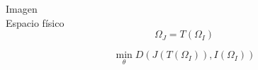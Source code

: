 \documentclass{article}
\begin{document}
Imagen\\
Espacio f\'{i}sico
\begin{equation}
    \Omega_{J} = T(\Omega_{I})
\end{equation}

\begin{equation}
    \min_{\theta} D(J(T(\Omega_{I})), I(\Omega_{I}))
\end{equation}
\end{document}
